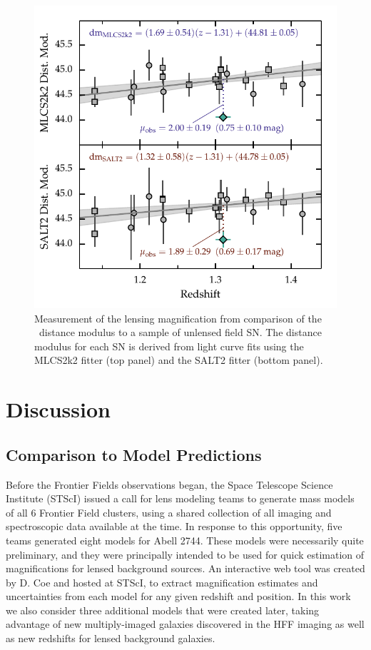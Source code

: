 \begin{figure}
\begin{center}
\includegraphics[width=\columnwidth]{FIG/snTomas_hubble_diagram}
\caption{ Measurement of the lensing magnification from comparison of
the \tomas\ distance modulus to a sample of unlensed field SN.
The distance modulus for each SN is derived from light curve fits
using the MLCS2k2 fitter (top panel) and the SALT2 fitter (bottom panel).
\label{fig:MagnificationMeasurement} }
\end{center}
\end{figure}


\section{Discussion}
\label{sec:Discussion}

\subsection{Comparison to Model Predictions}
\label{sec:ComparisonToModelPredictions}

Before the Frontier Fields observations began, the Space Telescope
Science Institute (STScI) issued a call for lens modeling teams to
generate mass models of all 6 Frontier Field clusters, using a shared
collection of all imaging and spectroscopic data available at the
time.  In response to this opportunity, five teams generated eight
models for Abell 2744.  These models were necessarily quite
preliminary, and they were principally intended to be used for quick
estimation of magnifications for lensed background sources. An
interactive web tool was created by D. Coe and hosted at STScI, to
extract magnification estimates and uncertainties from each model for
any given redshift and position.  In this work we also consider three
additional models that were created later, taking advantage of new
multiply-imaged galaxies discovered in the HFF imaging as well as new
redshifts for lensed background galaxies.

